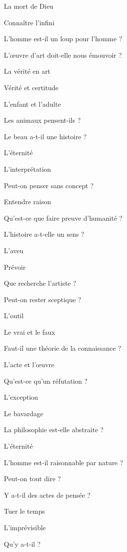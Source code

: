 \documentclass[a4paper,12pt]{report}
\begin{document}
\begin{multicols}{2}
\noindent La mort de Dieu \par
\noindent Connaître l'infini \par
\noindent L'homme est-il un loup pour l'homme ? \par
\noindent L'œuvre d'art doit-elle nous émouvoir ? \par
\noindent La vérité en art \par
\noindent Vérité et certitude \par
\noindent L'enfant et l'adulte \par
\noindent Les animaux pensent-ils ? \par
\noindent Le beau a-t-il une histoire ? \par
\noindent L'éternité \par
\noindent L'interprétation \par
\noindent Peut-on penser sans concept ? \par
\noindent Entendre raison \par
\noindent Qu'est-ce que faire preuve d'humanité ? \par
\noindent L'histoire a-t-elle un sens ? \par
\noindent L'aveu \par
\noindent Prévoir \par
\noindent Que recherche l'artiste ? \par
\noindent Peut-on rester sceptique ? \par
\noindent L'outil \par
\noindent Le vrai et le faux \par
\noindent Faut-il une théorie de la connaissance ? \par
\noindent L'acte et l'œuvre \par
\noindent Qu'est-ce qu'un réfutation ? \par
\noindent L'exception \par
\noindent Le bavardage \par
\noindent La philosophie est-elle abstraite ? \par
\noindent L'éternité \par
\noindent L'homme est-il raisonnable par nature ? \par
\noindent Peut-on tout dire ? \par
\noindent Y a-t-il des actes de pensée ? \par
\noindent Tuer le temps \par
\noindent L'imprévisible \par
\noindent Qu'y a-t-il ? \par

\end{multicols}
\end{document}
